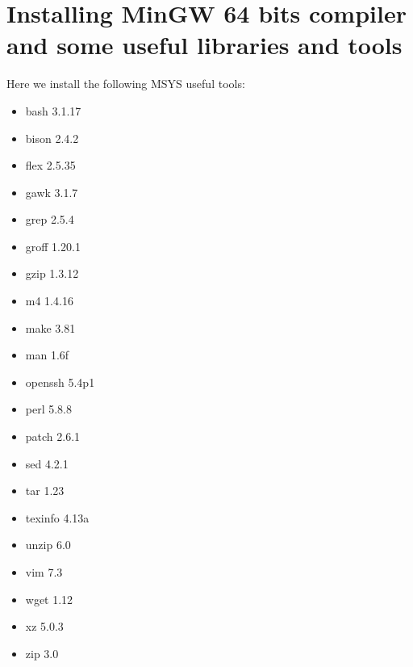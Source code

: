 \documentclass[a4paper]{article}
\begin{document}
\section{Installing MinGW 64 bits compiler and some useful libraries and tools}

Here we install the following MSYS useful tools:
\begin{itemize}
\item bash 3.1.17
\item bison 2.4.2
\item flex 2.5.35
\item gawk 3.1.7
\item grep 2.5.4
\item groff 1.20.1
\item gzip 1.3.12
\item m4 1.4.16
\item make 3.81
\item man 1.6f
\item openssh 5.4p1
\item perl 5.8.8
\item patch 2.6.1
\item sed 4.2.1
\item tar 1.23
\item texinfo 4.13a
\item unzip 6.0
\item vim 7.3
\item wget 1.12
\item xz 5.0.3
\item zip 3.0
\end{itemize}
\end{document}
